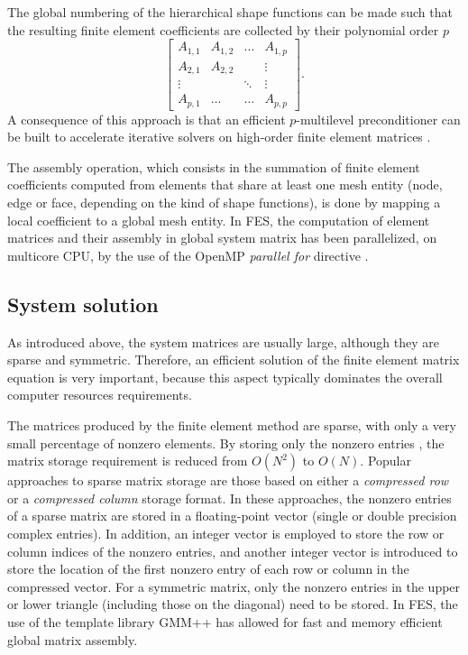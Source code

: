 The global numbering of the hierarchical shape functions can be made such that the resulting finite element coefficients are collected by their polynomial order $p$
$$
\begin{bmatrix}
A_{1,1} & A_{1,2} & \ldots & A_{1,p}\\
A_{2,1} & A_{2,2} &  & \vdots\\ 
\vdots & & \ddots & \vdots\\
A_{p,1} & \ldots & \ldots & A_{p,p}
\end{bmatrix}.
$$
\noindent A consequence of this approach is that an efficient $p$-multilevel preconditioner can be built to accelerate iterative solvers on high-order finite element matrices \cite{sun2001construction, ingelstrom2006new}.

The assembly operation, which consists in the summation of finite element coefficients computed from elements that share at least one mesh entity (node, edge or face, depending on the kind of shape functions), is done by mapping a local coefficient to a global mesh entity. In FES, the computation of element matrices and their assembly in global system matrix has been parallelized, on multicore CPU, by the use of the OpenMP \textit{parallel for} directive \cite{chapman2008using}.

\subsection{System solution}

As introduced above, the system matrices are usually large, although they are sparse and symmetric. Therefore, an efficient solution of the finite element
matrix equation is very important, because this aspect typically dominates the overall computer resources requirements. %

The matrices produced by the finite element method are sparse, with only a very small percentage of nonzero elements. By storing only the nonzero entries \cite{shahnaz2005review}, the matrix storage requirement is reduced from $O(N^2)$ to $O(N)$. Popular approaches to sparse matrix storage are those based on either a \textit{compressed row} or a \textit{compressed column} storage format. In these approaches, the nonzero entries of a sparse matrix are stored in a floating-point vector (single or double precision complex entries). In addition, an integer vector is employed to store the row or column indices of the nonzero entries, and another integer vector is introduced to store the location of the first nonzero entry of each row or column in the compressed vector. For a symmetric matrix, only the nonzero entries in the upper or lower triangle (including those on the diagonal) need to be stored. In FES, the use of the template library GMM++ \cite{renard2005gmm++} has allowed for fast and memory efficient global matrix assembly.

